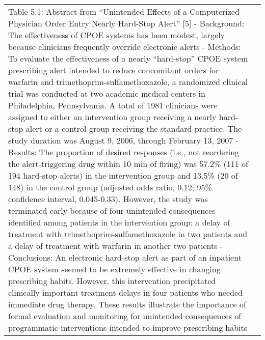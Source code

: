 \begin{landscape}
\begin{longtable}{p{3cm}p{}}
    Table 5.1: Abstract from ``Unintended Effects of a Computerized Physician Order Entry Nearly Hard-Stop Alert'' [5]
    - Background: The effectiveness of CPOE systems has been modest, largely because clinicians frequently override electronic alerts
    - Methods: To evaluate the effectiveness of a nearly ``hard-stop'' CPOE system prescribing alert intended to reduce concomitant orders for warfarin and trimethoprim-sulfamethoxazole, a randomized clinical trial was conducted at two academic medical centers in Philadelphia, Pennsylvania. A total of 1981 clinicians were assigned to either an intervention group receiving a nearly hard-stop alert or a control group receiving the standard practice.
    The study duration was August 9, 2006, through February 13, 2007
    - Results: The proportion of desired responses (i.e., not reordering the alert-triggering drug within 10 min of firing) was 57.2\% (111 of 194 hard-stop alerts) in the intervention group and 13.5\% (20 of 148) in the control group (adjusted odds ratio, 0.12; 95\% confidence interval, 0.045-0.33). However, the study was terminated early because of four unintended consequences identified among patients in the intervention group: a delay of treatment with trimethoprim-sulfamethoxazole in two patients and a delay of treatment with warfarin in another two patients
    - Conclusions: An electronic hard-stop alert as part of an inpatient CPOE system seemed to be extremely effective in changing prescribing habits.
    However, this intervention precipitated clinically important treatment delays in four patients who needed immediate drug therapy.
    These results illustrate the importance of formal evaluation and monitoring for unintended consequences of programmatic interventions intended to improve prescribing habits


\end{longtable}
\end{landscape}

